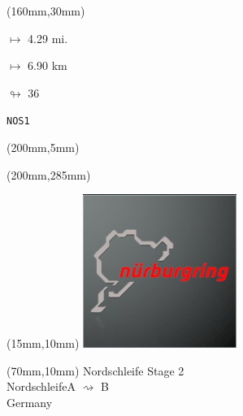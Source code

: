 \begin{textblock*}{40mm}(160mm,30mm)%
\Large
\par$\mapsto$ 4.29 mi.
\par$\mapsto$ 6.90 km
\par$\looparrowright$ 36
\par\hfill\tiny\tt NOS1\\
\end{textblock*}
\begin{textblock*}{20mm}(200mm,5mm)%
\fbox{\thepage}
\label{NOS1}
\end{textblock*}
\begin{textblock*}{20mm}(200mm,285mm)%
\fbox{\thepage}
\end{textblock*}

\null\newpage
\begin{textblock*}{50mm}(15mm,10mm)%
\includegraphics[width=50mm]{LG/2015-05-20_00088.png}
\end{textblock*}
\begin{textblock*}{130mm}(70mm,10mm)%
{\fontsize{20}{20}\selectfont Nordschleife Stage 2\\}
{\fontsize{16}{16}\selectfont Nordschleife\hfill A $\rightsquigarrow$ B\\}
{\fontsize{12}{12}\selectfont Germany\\}
\end{textblock*}
